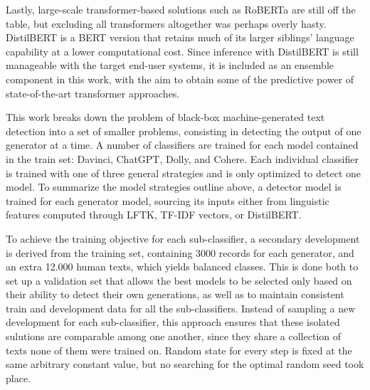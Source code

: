 Lastly, large-scale transformer-based solutions such as RoBERTa are still off the table, but excluding all transformers altogether was perhaps overly hasty.
DistilBERT \citep{sanh2020distilbertdistilledversionbert} is a BERT version that retains much of its larger siblings' language capability at a lower computational cost.
Since inference with DistilBERT is still manageable with the target end-user systems, it is included as an ensemble component in this work, with the aim to obtain some of the predictive power of state-of-the-art transformer approaches.

This work breaks down the problem of black-box machine-generated text detection into a set of smaller problems, consisting in detecting the output of one generator at a time.
A number of classifiers are trained for each model contained in the train set: Davinci, ChatGPT, Dolly, and Cohere.
Each individual classifier is trained with one of three general strategies and is only optimized to detect one model.
To summarize the model strategies outline above, a detector model is trained for each generator model, sourcing its inputs either from linguistic features computed through LFTK, TF-IDF vectors, or DistilBERT.

To achieve the training objective for each sub-classifier, a secondary development is derived from the training set, containing 3000 records for each generator, and an extra 12.000 human texts, which yields balanced classes.
This is done both to set up a validation set that allows the best models to be selected only based on their ability to detect their own generations, as well as to maintain consistent train and development data for all the sub-classifiers.
Instead of sampling a new development for each sub-classifier, this approach ensures that these isolated sulutions are comparable among one another, since they share a collection of texts none of them were trained on.
Random state for every step is fixed at the same arbitrary constant value, but no searching for the optimal random seed took place.

